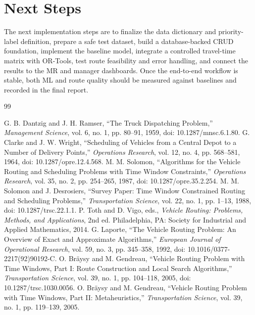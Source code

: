 \documentclass[12pt,a4paper,oneside]{report}
\begin{document}
\section{Next Steps}
The next implementation steps are to finalize the data dictionary and priority-label definition, prepare a safe test dataset, build a database-backed CRUD foundation, implement the baseline model, integrate a controlled travel-time matrix with OR-Tools, test route feasibility and error handling, and connect the results to the MR and manager dashboards. Once the end-to-end workflow is stable, both ML and route quality should be measured against baselines and recorded in the final report.

\clearpage
\begin{thebibliography}{99}
 G. B. Dantzig and J. H. Ramser, ``The Truck Dispatching Problem,'' \textit{Management Science}, vol. 6, no. 1, pp. 80--91, 1959, doi: 10.1287/mnsc.6.1.80.
 G. Clarke and J. W. Wright, ``Scheduling of Vehicles from a Central Depot to a Number of Delivery Points,'' \textit{Operations Research}, vol. 12, no. 4, pp. 568--581, 1964, doi: 10.1287/opre.12.4.568.
 M. M. Solomon, ``Algorithms for the Vehicle Routing and Scheduling Problems with Time Window Constraints,'' \textit{Operations Research}, vol. 35, no. 2, pp. 254--265, 1987, doi: 10.1287/opre.35.2.254.
 M. M. Solomon and J. Desrosiers, ``Survey Paper: Time Window Constrained Routing and Scheduling Problems,'' \textit{Transportation Science}, vol. 22, no. 1, pp. 1--13, 1988, doi: 10.1287/trsc.22.1.1.
 P. Toth and D. Vigo, eds., \textit{Vehicle Routing: Problems, Methods, and Applications}, 2nd ed. Philadelphia, PA: Society for Industrial and Applied Mathematics, 2014.
 G. Laporte, ``The Vehicle Routing Problem: An Overview of Exact and Approximate Algorithms,'' \textit{European Journal of Operational Research}, vol. 59, no. 3, pp. 345--358, 1992, doi: 10.1016/0377-2217(92)90192-C.
 O. Br\"aysy and M. Gendreau, ``Vehicle Routing Problem with Time Windows, Part I: Route Construction and Local Search Algorithms,'' \textit{Transportation Science}, vol. 39, no. 1, pp. 104--118, 2005, doi: 10.1287/trsc.1030.0056.
 O. Br\"aysy and M. Gendreau, ``Vehicle Routing Problem with Time Windows, Part II: Metaheuristics,'' \textit{Transportation Science}, vol. 39, no. 1, pp. 119--139, 2005.

\end{thebibliography}
\end{document}
